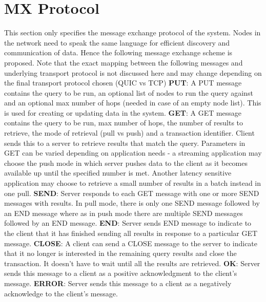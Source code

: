 \documentclass[preprint,12pt]{elsarticle}
\begin{document}
\section{MX Protocol}
This section only specifies the message exchange protocol of the system. Nodes in the network need to speak the same language for efficient discovery and communication of data. Hence the following message exchange scheme is proposed. Note that the exact mapping between the following messages and underlying transport protocol is not discussed here and may change depending on the final transport protocol chosen (QUIC vs TCP)
\newline
\newline
\textbf{PUT}:  A PUT message contains the query to be run, an optional list of nodes to run the query against and an optional max number of hops (needed in case of an empty node list). This is used for creating or updating data in the system.
\newline
\newline
\textbf{GET}: A GET message contains the query to be run, max number of hops, the number of results to retrieve, the mode of retrieval (pull vs push) and a transaction identifier. Client sends this to a server to retrieve results that match the query. Parameters in GET can be varied depending on application needs - a streaming application may choose the push mode in which server pushes data to the client as it becomes available up until the specified number is met. Another latency sensitive application may choose to retrieve a small number of results in a batch instead in one pull.
\newline
\newline
\textbf{SEND}: Server responds to each GET message with one or more SEND messages with results. In pull mode, there is only one SEND message followed by an END message where as in push mode there are multiple SEND messages followed by an END message.
\newline
\newline
\textbf{END}: Server sends END message to indicate to the client that it has finished sending all results in response to a particular GET message.
\newline
\newline
\textbf{CLOSE}: A client can send a CLOSE message to the server to indicate that it no longer is interested in the remaining query results and close the transaction. It doesn't have to wait until all the results are retrieved.
\newline
\newline
\textbf{OK}: Server sends this message to a client as a positive acknowledgment to the client's message.
\newline
\newline
\textbf{ERROR}: Server sends this message to a client as a negatively acknowledge to the client's message.
\end{document}
